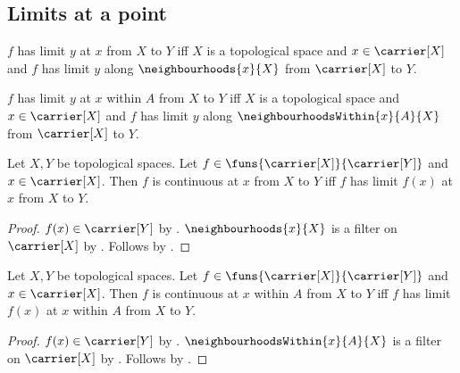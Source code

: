 \subsection{Limits at a point}

\begin{definition}\label{function_has_limit_at}
    $f$ has limit $y$ at $x$ from $X$ to $Y$ iff
        $X$ is a topological space and
        $x\in\carrier[X]$ and
        $f$ has limit $y$ along $\neighbourhoods{x}{X}$ from
            $\carrier[X]$ to $Y$.
\end{definition}

\begin{definition}\label{function_has_limit_within}
    $f$ has limit $y$ at $x$ within $A$ from $X$ to $Y$ iff
        $X$ is a topological space and
        $x\in\carrier[X]$ and
        $f$ has limit $y$ along $\neighbourhoodsWithin{x}{A}{X}$ from
            $\carrier[X]$ to $Y$.
\end{definition}

\begin{theorem}\label{continuous_at_iff_limit_at_self}
    Let $X,Y$ be topological spaces.
    Let $f\in\funs{\carrier[X]}{\carrier[Y]}$ and
        $x\in\carrier[X]$.
    Then $f$ is continuous at $x$ from $X$ to $Y$ iff
        $f$ has limit $f(x)$ at $x$ from $X$ to $Y$.
\end{theorem}
\begin{proof}
    $f(x)\in\carrier[Y]$ by .
    $\neighbourhoods{x}{X}$ is a filter on $\carrier[X]$ by
        .
    Follows by
        .
\end{proof}

\begin{theorem}\label{continuous_at_within_iff_limit_within_self}
    Let $X,Y$ be topological spaces.
    Let $f\in\funs{\carrier[X]}{\carrier[Y]}$ and
        $x\in\carrier[X]$.
    Then $f$ is continuous at $x$ within $A$ from $X$ to $Y$ iff
        $f$ has limit $f(x)$ at $x$ within $A$ from $X$ to $Y$.
\end{theorem}
\begin{proof}
    $f(x)\in\carrier[Y]$ by .
    $\neighbourhoodsWithin{x}{A}{X}$ is a filter on $\carrier[X]$ by
        .
    Follows by
        .
\end{proof}

